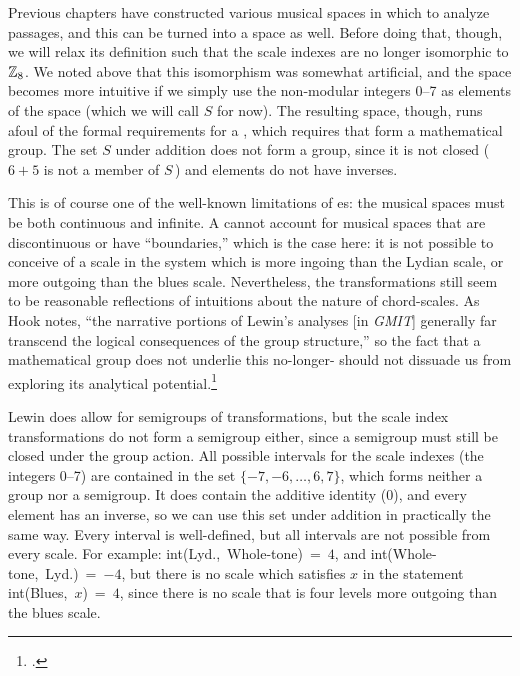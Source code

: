 Previous chapters have constructed various musical spaces in which to analyze
passages, and this \gis can be turned into a space as well. Before doing that,
though, we will relax its definition such that the scale indexes are no longer
isomorphic to $\mathbb{Z}_8$. We noted above that this isomorphism was somewhat
artificial, and the space becomes more intuitive if we simply use the
non-modular integers 0--7 as elements of the space (which we will call $S$ for
now). The resulting space, though, runs afoul of the formal requirements for a
\gis, which requires that \ivls form a mathematical group. The set $S$ under
addition does not form a group, since it is not closed ($6+5$ is not a member
of $S$\,) and elements do not have inverses.

This is of course one of the well-known limitations of \gis{}es: the musical
spaces must be both continuous and infinite. A \gis cannot account for
musical spaces that are discontinuous or have ``boundaries,'' which is the
case here: it is not possible to conceive of a scale in the system which is
more ingoing than the Lydian scale, or more outgoing than the blues
scale. Nevertheless, the transformations still seem
to be reasonable reflections of intuitions about the nature of chord-scales.
As Hook notes, ``the narrative portions of Lewin's analyses [in \emph{GMIT}]
generally far transcend the logical consequences of the group structure,'' so
the fact that a mathematical group does not underlie this no-longer-\gis
should not dissuade us from exploring its analytical
potential.\footcite[185]{hook:2007gmit}

Lewin does allow for semigroups of transformations, but the scale index
transformations do not form a semigroup either, since a semigroup must still
be closed under the group action. All possible intervals for the scale indexes
(the integers 0--7) are contained in the set $\{-7, -6, \ldots, 6, 7\}$, which
forms neither a group nor a semigroup. It does contain the additive identity
($0$), and every element has an inverse, so we can use this set under addition
in practically the same way. Every interval is well-defined, but all intervals
are not possible from every scale. For example: \mbox{int(Lyd., Whole-tone) =
  $4$}, and \mbox{int(Whole-tone, Lyd.) = $-4$}, but there is no scale which
satisfies $x$ in the statement \mbox{int(Blues, $x$) = $4$}, since there is no
scale that is four levels more outgoing than the blues scale.

